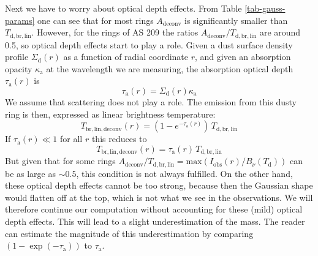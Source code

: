 \documentclass{aa}
\begin{document}
Next we have to worry about optical depth effects. From Table
\ref{tab-gauss-params} one can see that for most rings 
$A_{\mathrm{deconv}}$ is significantly smaller than $T_{\mathrm{d,br,lin}}$.
However, for the rings of AS 209 the ratios
$A_{\mathrm{deconv}}/T_{\mathrm{d,br,lin}}$ are around 0.5, so optical depth
effects start to play a role. Given a dust surface density profile
$\Sigma_{\mathrm{d}}(r)$ as a function of radial coordinate $r$, and
given an absorption opacity $\kappa_{\mathrm{a}}$ at the wavelength we
are measuring, the absorption optical depth $\tau_{\mathrm{a}}(r)$ is
\begin{equation}\label{eq-tau-afo-sig-kap}
\tau_{\mathrm{a}}(r) = \Sigma_{\mathrm{d}}(r)\kappa_{\mathrm{a}}
\end{equation}
We assume that scattering does not play a role. The emission from this
dusty ring is then, expressed as linear brightness temperature:
\begin{equation}
T_{\mathrm{br,lin,deconv}}(r) = \left(1-e^{-\tau_{\mathrm{a}}(r)}\right)\,T_{\mathrm{d,br,lin}}
\end{equation}
If $\tau_{\mathrm{a}}(r)\ll 1$ for all $r$ this reduces to
\begin{equation}\label{eq-int-afo-tau-bnu}
T_{\mathrm{br,lin,deconv}}(r) = \tau_{\mathrm{a}}(r)\,T_{\mathrm{d,br,lin}}
\end{equation}
But given that for some rings $A_{\mathrm{deconv}}/T_{\mathrm{d,br,lin}}
=\mathrm{max}(I_{\mathrm{obs}}(r)/B_\nu(T_{\mathrm{d}}))$ can be as large as
$\sim 0.5$, this condition is not always fulfilled.  On the other hand, these
optical depth effects cannot be too strong, because then the Gaussian shape
would flatten off at the top, which is not what we see in the observations. We
will therefore continue our computation without accounting for these (mild)
optical depth effects. This will lead to a slight underestimation of the
mass. The reader can estimate the magnitude of this underestimation by comparing
$(1-\exp(-\tau_{\mathrm{a}}))$ to $\tau_{\mathrm{a}}$.
\end{document}
